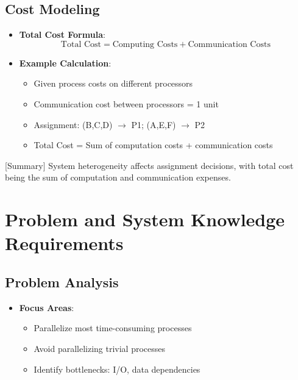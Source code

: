 \documentclass[12pt]{article}
\begin{document}
\subsection{Cost Modeling}
\begin{itemize}
\item \textbf{Total Cost Formula}:
  \[
  \text{Total Cost} = \text{Computing Costs} + \text{Communication Costs}
  \]
  
\item \textbf{Example Calculation}:
  \begin{itemize}
  \item Given process costs on different processors
  \item Communication cost between processors = 1 unit
  \item Assignment: (B,C,D) $\rightarrow$ P1; (A,E,F) $\rightarrow$ P2
  \item Total Cost = Sum of computation costs + communication costs
  \end{itemize}
\end{itemize}

[Summary] System heterogeneity affects assignment decisions, with total cost being the sum of computation and communication expenses.

\section{Problem and System Knowledge Requirements}

\subsection{Problem Analysis}
\begin{itemize}
\item \textbf{Focus Areas}:
  \begin{itemize}
  \item Parallelize most time-consuming processes
  \item Avoid parallelizing trivial processes
  \item Identify bottlenecks: I/O, data dependencies
  \end{itemize}
\end{itemize}
\end{document}
